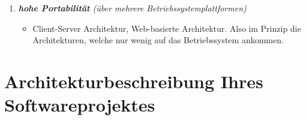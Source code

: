 \begin{enumerate}[(a)]
\begin{enumerate}[1.]
        \item {\itshape \textbf{hohe Portabilität} (über mehrere Betriebssystemplattformen)}
        \begin{itemize}
            \item Client-Server Architektur, Web-basierte Architektur. Also im Prinzip die Architekturen, welche nur wenig auf das Betriebssystem ankommen. 
        \end{itemize}
    \end{enumerate}

\end{enumerate}

\section{Architekturbeschreibung Ihres Softwareprojektes}
